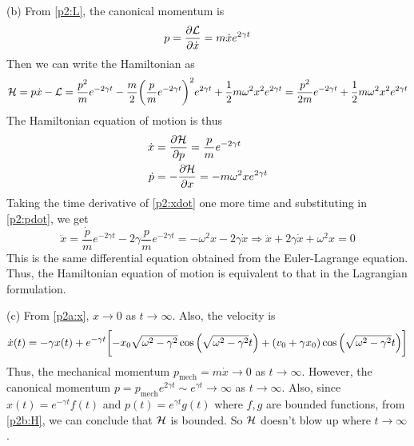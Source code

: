 \documentclass[12pt]{article}
\begin{document}
\begin{problem}{2}
\begin{solution}
(b) From \eqref{p2:L}, the canonical momentum is
\begin{equation}
    p=\frac{\partial\mathcal{L}}{\partial\dot{x}}
    =m\dot{x}e^{2\gamma t}
\end{equation}
Then we can write the Hamiltonian as
\begin{equation}\label{p2b:H}
    \mathcal{H}=p\dot{x}-\mathcal{L} 
    =\frac{p^2}{m}e^{-2\gamma t}-\frac{m}{2}\qty(\frac{p}{m}e^{-2\gamma
    t})^2e^{2\gamma t}+\frac12m\omega^2x^2e^{2\gamma t}
    =\frac{p^2}{2m}e^{-2\gamma t}+\frac12m\omega^2x^2e^{2\gamma t}
\end{equation}
The Hamiltonian equation of motion is thus
\begin{subequations}
    \begin{align}
        \dot{x}&=\frac{\partial\mathcal{H}}{\partial p}=\frac{p}{m}e^{-2\gamma
        t}\label{p2:xdot}\\
        \dot{p}&=-\frac{\partial\mathcal{H}}{\partial x}
        =-m\omega^2xe^{2\gamma t}\label{p2:pdot}
    \end{align} 
\end{subequations}
Taking the time derivative of \eqref{p2:xdot} one more time and substituting in
\eqref{p2:pdot}, we get
\begin{equation}
    \ddot{x}=\frac{\dot{p}}{m}e^{-2\gamma t}-2\gamma\frac{p}{m}e^{-2\gamma t} 
    =-\omega^2x-2\gamma\dot{x}\Rightarrow
    \ddot{x}+2\gamma\dot{x}+\omega^2x=0
\end{equation}
This is the same differential equation obtained from the Euler-Lagrange
equation. Thus, the Hamiltonian equation of motion is equivalent to that in the
Lagrangian formulation.

(c) From \eqref{p2a:x}, $x\to0$ as $t\to\infty$. Also, the velocity is
\begin{equation}
    \dot{x}(t)=-\gamma x(t)+e^{-\gamma
    t}\qty[-x_0\sqrt{\omega^2-\gamma^2}\cos\qty(\sqrt{\omega^2-\gamma^2}t)+\qty(v_0+\gamma
    x_0)\cos\qty(\sqrt{\omega^2-\gamma^2}t)]
\end{equation}
Thus, the mechanical momentum $p_\text{mech}=m\dot{x}\to0$ as $t\to\infty$.
However, the canonical momentum $p=p_\text{mech}e^{2\gamma t}\sim e^{\gamma
t}\to\infty$ as $t\to\infty$. Also, since $x(t)=e^{-\gamma t}f(t)$ and 
$p(t)=e^{\gamma t}g(t)$ where $f,g$ are bounded functions, from
\eqref{p2b:H}, we can conclude that $\mathcal{H}$ is bounded. So $\mathcal{H}$ doesn't blow up
where $t\to\infty$.
\end{solution}
\end{problem}
    
\end{document}
